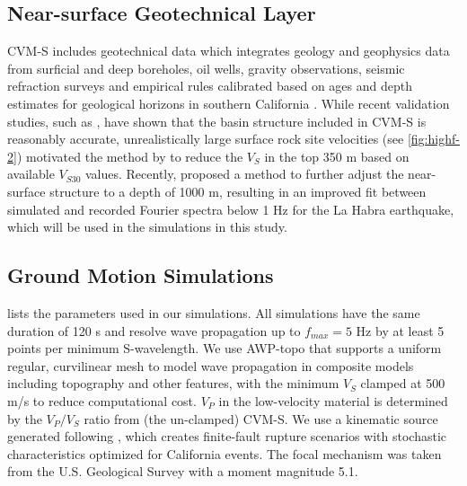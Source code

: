 \subsection{Near-surface Geotechnical Layer}
CVM-S includes geotechnical data which integrates geology and geophysics data from surficial and deep boreholes, oil wells, gravity observations, seismic refraction surveys and empirical rules calibrated based on ages and depth estimates for geological horizons in southern California \citep{magistraleGeologybased3DVelocity1996,magistraleSCECSouthernCalifornia2000}. While recent validation studies, such as \citet{tabordaEvaluationSouthernCalifornia2016}, have shown that the basin structure included in CVM-S is reasonably accurate, unrealistically large surface rock site velocities (see \cref{fig:highf-2}) motivated the method by \citet{elyVs30derivedNearsurfaceSeismic2010} to reduce the $V_S$ in the top 350 m based on available $V_{S30}$ values. Recently, \citet{huCalibrationNearsurfaceSeismic2021} proposed a method to further adjust the near-surface structure to a depth of 1000 m, resulting in an improved fit between simulated and recorded Fourier spectra below 1 Hz for the La Habra earthquake, which will be used in the simulations in this study.

\subsection{Ground Motion Simulations}
 lists the parameters used in our simulations. All simulations have the same duration of 120 s and resolve wave propagation up to $f_{max}=5$ Hz by at least 5 points per minimum S-wavelength. We use AWP-topo that supports a uniform regular, curvilinear mesh to model wave propagation in composite models including topography and other features, with the minimum $V_S$ clamped at 500 m/s to reduce computational cost. $V_P$ in the low-velocity material is determined by the $V_P/V_S$ ratio from (the un-clamped) CVM-S. We use a kinematic source generated following \citet{gravesKinematicGroundMotion2016}, which creates finite-fault rupture scenarios with stochastic characteristics optimized for California events. The focal mechanism was taken from the U.S. Geological Survey \citep[strike=233$^\circ$, dip=77$^\circ$, rake=49$^\circ$;][]{usgsEarthquakeEventsFocal2014} with a moment magnitude 5.1.


